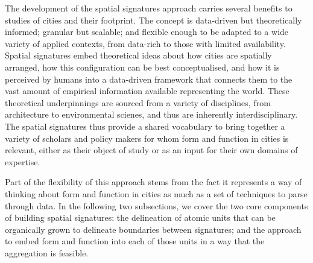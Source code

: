 The development of the spatial signatures approach carries several benefits
to studies of cities and their footprint.
The concept is data-driven but theoretically informed;
granular but scalable; and flexible enough to be adapted to a wide variety of
applied contexts, from data-rich to those with limited availability.
Spatial signatures embed theoretical ideas about how cities are
spatially arranged, how this configuration can be best conceptualised, and how
it is perceived by humans into a data-driven framework that connects them to the
vast amount of empirical information available representing the world.
These theoretical underpinnings are sourced from a variety of disciplines,
from architecture to environmental scienes, and thus are inherently
interdisciplinary.
The spatial signatures thus provide a shared vocabulary to bring together a
variety of scholars and policy makers for whom form and function in cities is
relevant, either as their object of study or as an input for their own domains
of expertise.

Part of the flexibility of this approach stems from the fact it represents a
way of thinking about form and function in cities as much as a set of
techniques to parse through data.
%
In the following two subsections, we cover the two core components of building
spatial signatures: the delineation of atomic units that can be organically
grown to delineate boundaries between signatures; and the approach to embed
form and function into each of those units in a way that the aggregation is
feasible.





